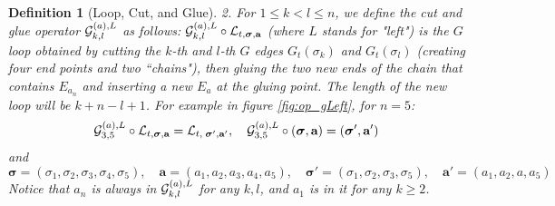\documentclass[10pt,reqno]{article}
\theoremstyle{plain} %
\newtheorem{definition}[theorem]{Definition}
\theoremstyle{remark}
\numberwithin{equation}{section}
\begin{document}
\begin{definition}[Loop, Cut, and Glue]
 \noindent 
 \emph{2.}  For $1 \le k < l \le n$, we define the cut and glue operator ${\cal G}^{(a), L}_{k, l}$ as follows: ${\cal G}^{(a), L}_{k, l} \circ {\cal L}_{t, \boldsymbol{\sigma}, \textbf{a}}$ (where $L$ stands for "left") is the $G$ loop obtained by cutting the $k$-th and $l$-th $G$ edges $G_t(\sigma_k)$ and $G_t(\sigma_l)$ (creating four end points and two ``chains"), then gluing the two new ends of the chain that contains $E_{a_n}$ and inserting a new $E_a$ at the gluing point. The length of the new loop will be $k + n - l + 1$. For example in figure \ref{fig:op_gLeft}, for $n=5$:
    $$
    {\cal G}^{(a), L}_{3, 5} \circ {\cal L}_{t, \boldsymbol{\sigma}, \textbf{a}} = {\cal L}_{t, \; \boldsymbol{\sigma}', \textbf{a}'}, \quad 
     {\cal G}^{(a), L}_{3, 5}\circ\left(\boldsymbol{\sigma}, \textbf{a}\right)=\left(\boldsymbol{\sigma}', \textbf{a}'\right)
    $$
and 
$$ \boldsymbol{\sigma}=(\sigma_1,\sigma_2,\sigma_3,\sigma_4,\sigma_5),\quad 
   \textbf{a}= (a_1,a_2,a_3,a_4,a_5),\quad \boldsymbol{\sigma}' = (\sigma_1, \sigma_2, \sigma_3, \sigma_5), \quad \textbf{a}' = (a_1, a_2, a, a_5)
$$
  Notice that $a_n$ is always in ${\cal G}^{(a), L}_{k, l}$ for any $k, l$, and $a_1$ is in it for any $k\ge 2$.  

    
    \begin{figure}[ht]
        \centering
\end{figure}
\end{definition}
\end{document}
